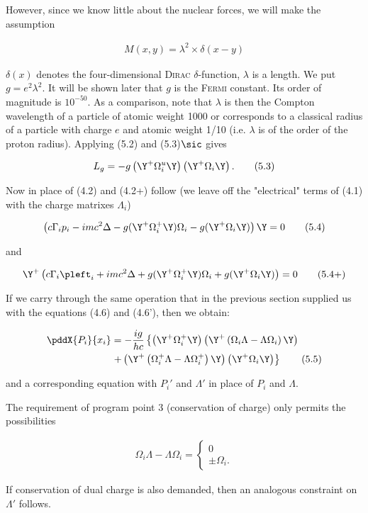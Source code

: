 \documentclass{article}
\newcommand{\nequ}[2]{
\begin{align*}
#1
\tag{#2}
\end{align*}
}
\begin{document}
However, since we know little about the nuclear forces, we will make the assumption
\nequ{
M(x,y) = \lambda^2\times \delta(x-y)
}{5.2}
$\delta(x)$ denotes the four-dimensional \textsc{Dirac} $\delta$-function, $\lambda$ is a length. We put $g=e^2 \lambda^2$. It will be shown later that $g$ is the \textsc{Fermi}\cite{9} constant. Its order of magnitude is $10^{-50}$. As a comparison, note that $\lambda$ is then the Compton wavelength of a particle of atomic weight 1000 or corresponds to a classical radius of a particle with charge $e$ and atomic weight 1/10 (i.e. $\lambda$ is of the order of the proton radius). Applying (5.2) and (5.3)$\sic$ gives
\nequ{
L_g = -g\left(\Y^+ \Omega_i^u \Y\right)\left(\Y^+ \Omega_i \Y \right).
}{5.3}
Now in place of (4.2) and (4.2+) follow (we leave off the "electrical" terms of (4.1) with the charge matrixes $\Lambda_i$)
\nequ{
\left(c\Gamma_i p_i - imc^2\Delta - g(\Y^+\Omega_i^+ \Y)\Omega_i 
 - g(\Y^+ \Omega_i \Y) \right)\Y = 0
}{5.4}
and
\nequ{
\Y^+\left(c\Gamma_i \pleft_i + imc^2\Delta + g(\Y^+\Omega_i^+ \Y)\Omega_i 
 + g(\Y^+ \Omega_i \Y) \right) = 0
}{5.4+}
If we carry through the same operation that in the previous section supplied us with the equations (4.6) and (4.6'), then we obtain:
\nequ{
\pddX{P_i}{x_i} &= -\frac{ig}{hc}\left\{\left(\Y^+\Omega_i^+\Y\right)
  \left(\Y^+\left(\Omega_i \Lambda - \Lambda \Omega_i \right)\Y\right)\right.\\
&\left. + \left(\Y^+\left(\Omega_i^+ \Lambda - \Lambda \Omega_i^+\right)\Y\right)
\left(\Y^+\Omega_i \Y\right)
\right\}
}{5.5}
and a corresponding equation with $P_i'$ and $\Lambda'$ in place of $P_i$ and $\Lambda$.

The requirement of program point 3 (conservation of charge) only permits the possibilities
\nequ{
\Omega_i\Lambda - \Lambda\Omega_i = \begin{cases}
 0\\
 \pm \Omega_i.
 \end{cases}
}{5.6}
If conservation of dual charge is also demanded, then an analogous constraint on $\Lambda'$ follows.
\end{document}
